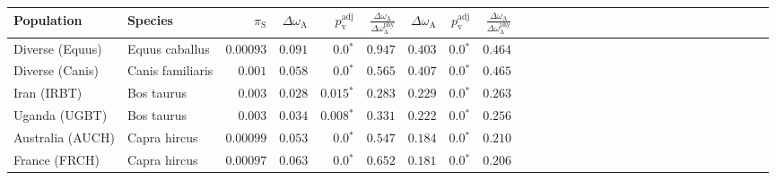 \begin{center}
\begin{adjustbox}{width = 1\textwidth}
\begin{tabular}{|l|l|r|r|r|r|r|r|r|r|r|r|r|r|r|r|r|r|r|r|r|r|r|r|r|r|r|r|r|}
\toprule
                     Population &              Species & $\pi_{\textrm{S}}$ & $\Delta \omega_{\mathrm{A}} $ & $p_{\mathrm{v}}^{\mathrm{adj}}$ & $\frac{\Delta\omega_{\mathrm{A}}}{\Delta\omega_{\mathrm{A}}^{\mathrm{phy}}}$ & $\Delta \omega_{\mathrm{A}} $ & $p_{\mathrm{v}}^{\mathrm{adj}}$ & $\frac{\Delta\omega_{\mathrm{A}}}{\Delta\omega_{\mathrm{A}}^{\mathrm{phy}}}$ \\
\midrule
                Diverse (Equus) &       Equus caballus &          $0.00093$ &                      $ 0.091$ &                  $\bm{0.0{^*}}$ &                                           $ 0.947$ &                      $ 0.403$ &                  $\bm{0.0{^*}}$ &                                           $ 0.464$ \\
                Diverse (Canis) &     Canis familiaris &           $ 0.001$ &                      $ 0.058$ &                  $\bm{0.0{^*}}$ &                                           $ 0.565$ &                      $ 0.407$ &                  $\bm{0.0{^*}}$ &                                           $ 0.465$ \\
                    Iran (IRBT) &           Bos taurus &           $ 0.003$ &                      $ 0.028$ &               $\bm{ 0.015{^*}}$ &                                           $ 0.283$ &                      $ 0.229$ &                  $\bm{0.0{^*}}$ &                                           $ 0.263$ \\
                  Uganda (UGBT) &           Bos taurus &           $ 0.003$ &                      $ 0.034$ &               $\bm{ 0.008{^*}}$ &                                           $ 0.331$ &                      $ 0.222$ &                  $\bm{0.0{^*}}$ &                                           $ 0.256$ \\
               Australia (AUCH) &         Capra hircus &          $0.00099$ &                      $ 0.053$ &                  $\bm{0.0{^*}}$ &                                           $ 0.547$ &                      $ 0.184$ &                  $\bm{0.0{^*}}$ &                                           $ 0.210$ \\
                  France (FRCH) &         Capra hircus &          $0.00097$ &                      $ 0.063$ &                  $\bm{0.0{^*}}$ &                                           $ 0.652$ &                      $ 0.181$ &                  $\bm{0.0{^*}}$ &                                           $ 0.206$ \\

\end{tabular}
\end{adjustbox}
\end{center}

